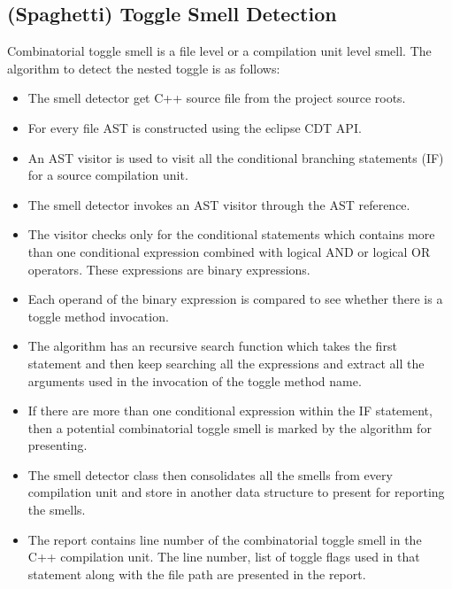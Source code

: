\documentclass[conference]{IEEEtran}
\begin{document}
\subsection{(Spaghetti) Toggle Smell Detection}
Combinatorial toggle smell is a file level or a compilation unit level smell. The algorithm to detect the nested toggle is as follows:
\begin{itemize}
	\item The smell detector get C++ source file from the project source roots.
	\item For every file AST is constructed using the eclipse CDT API.
	\item An AST visitor is used to visit all the conditional branching statements (IF) for a source compilation unit.
	\item The smell detector invokes an AST visitor through the AST reference.
	\item The visitor checks only for the conditional statements which contains more than one conditional expression combined with logical AND or logical OR operators. These expressions are binary expressions.
	\item Each operand of the binary expression is compared to see whether there is a toggle method invocation.
	\item The algorithm has an recursive search function which takes the first statement and then keep searching all the expressions and extract all the arguments used in the invocation of the toggle method name.
	\item If there are more than one conditional expression within the IF statement, then a potential combinatorial toggle smell is marked by the algorithm for presenting.
	\item The smell detector class then consolidates all the smells from every compilation unit and store in another data structure to present for reporting the smells.
	\item The report contains line number of the combinatorial toggle smell in the C++ compilation unit. The line number, list of toggle flags used in that statement along with the file path are presented in the report.
\end{itemize}
\end{document}
